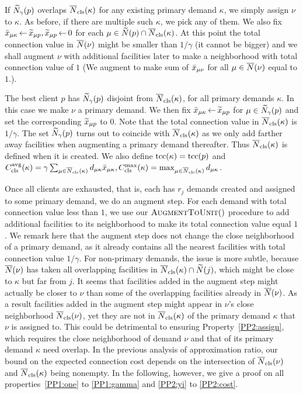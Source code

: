 \documentclass[11pt]{article}
\begin{document}
\smallskip
\noindent
{} If ${\widetilde N}_{\gamma}(p)$ overlaps
${\overline{N}}_{\text{cls}}(\kappa)$ for any existing primary
demand $\kappa$, we simply assign $\nu$ to $\kappa$. As
before, if there are multiple such $\kappa$, we pick any of
them. We also fix ${\bar x}_{\mu\kappa} {\,\leftarrow\,} {\widetilde x}_{\mu
  p}, {\widetilde x}_{\mu p}{\,\leftarrow\,} 0$ for each $\mu \in
{\widetilde N}(p)\cap {\overline{N}}_{\text{cls}}(\kappa)$. At this point
the total connection value in ${\overline{N}}(\nu)$ might be smaller
than $1/\gamma$ (it cannot be bigger) and we shall augment
$\nu$ with additional facilities later to make a
neighborhood with total connection value of $1$ (We
augment to make sum of ${\bar x}_{\mu\nu}$ for all
$\mu\in{\overline{N}}(\nu)$ equal to $1$.).

\smallskip
\noindent
{}
The best client $p$ has ${\widetilde N}_{\gamma}(p)$
disjoint from ${\overline{N}}_{\text{cls}}(\kappa)$, for all primary demands $\kappa$.
In this case we
make $\nu$ a primary demand. We then fix
${\bar x}_{\mu\kappa}{\,\leftarrow\,} {\widetilde x}_{\mu p}$ for $\mu \in
{\widetilde N}_{\gamma}(p)$ and set the corresponding
${\widetilde x}_{\mu p}$ to $0$.  Note that the total connection value in
${\overline{N}}_{\text{cls}}(\kappa)$ is $1/\gamma$.  The set
${\widetilde N}_{\gamma}(p)$ turns out to coincide with
${\overline{N}}_{\text{cls}}(\kappa)$ as we only add farther away facilities
when augmenting a primary demand thereafter. Thus
${\overline{N}}_{\text{cls}}(\kappa)$ is defined when it is created. We also
define $\textrm{tcc}(\kappa) = \textrm{tcc}(p)$ and
$C_{\text{cls}}^{{\mbox{\scriptsize\rm avg}}}(\kappa)=\gamma\sum_{\mu\in{\overline{N}}_{\text{cls}}(\kappa)}d_{\mu\kappa}{\bar x}_{\mu\kappa},
C_{\text{cls}}^{\max}(\kappa)=\max_{\mu\in{\overline{N}}_{\text{cls}}(\kappa)}d_{\mu\kappa}$.

Once all clients are exhausted, that is, each has $r_j$
demands created and assigned to some primary demand, we do
an augment step. For each demand with total connection value
less than $1$, we use our ${\textsc{AugmentToUnit}}()$ procedure to
add additional facilities to its neighborhood to make its
total connection value equal $1$. We remark here that the
augment step does not change the close neighborhood of a
primary demand, as it already contains all the nearest
facilities with total connection value $1/\gamma$.  For
non-primary demands, the issue is more subtle, because
${\overline{N}}(\nu)$ has taken all overlapping facilities in
${\overline{N}}_{\text{cls}}(\kappa)\cap {\widetilde N}(j)$, which might be close
to $\kappa$ but far from $j$. It seems that facilities added
in the augment step might actually be closer to $\nu$ than
some of the overlapping facilities already in
${\overline{N}}(\nu)$. As a result facilities added in the augment
step might appear in $\nu$'s close neighborhood
${\overline{N}}_{\text{cls}}(\nu)$, yet they are not in ${\overline{N}}_{\text{cls}}(\kappa)$
of the primary demand $\kappa$ that $\nu$ is assigned
to. This could be detrimental to ensuring
Property~\ref{PP2:assign}, which requires the close
neighborhood of demand $\nu$ and that of its primary demand
$\kappa$ need overlap. In the previous analysis of
approximation ratio, our bound on the expected connection
cost depends on the intersection of ${\overline{N}}_{\text{cls}}(\nu)$ and
${\overline{N}}_{\text{cls}}(\kappa)$ being nonempty. In the following,
however, we give a proof on all properties~\ref{PP1:one} to
\ref{PP1:gamma} and \ref{PP2:yi} to \ref{PP2:cost}.
\end{document}
